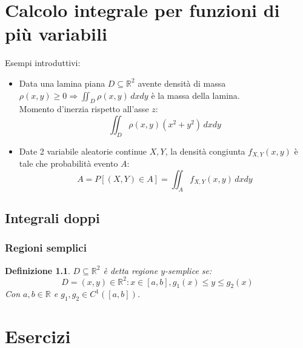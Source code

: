 \documentclass{scrreprt}
\newtheorem{defn}{Definizione}
\newenvironment{definition}{\begin{mdframed}[backgroundcolor=Ivory2]\begin{defn}}{\end{defn}\end{mdframed}}
\begin{document}
\chapter{Calcolo integrale per funzioni di più variabili}
Esempi introduttivi:
\begin{itemize}
	\item Data una lamina piana $D \subseteq \mathbb{R}^2$ avente densità di massa $\rho(x,y) \geq 0 \Longrightarrow \iint_D \rho(x,y) \, dxdy$ è la massa della lamina.\\
			Momento d'inerzia rispetto all'asse $z$:
			\begin{equation}
				\iint_D \rho(x,y) (x^2 + y^2) \, dxdy
			\end{equation}
	\item Date 2 variabile aleatorie continue $X,Y$, la densità congiunta $f_{X,Y}(x,y)$ è tale che probabilità evento $A$:
		\begin{equation}
			A = P[(X,Y) \in A] = \iint_A f_{X,Y}(x,y) \, dxdy
		\end{equation}
\end{itemize}

\section{Integrali doppi}
\subsection{Regioni semplici}
\begin{definition}
	$D \subseteq \mathbb{R}^2$ è detta regione $y$-semplice se:
	\begin{equation}
		D = {(x,y) \in \mathbb{R}^2: x \in [a,b], g_1(x) \leq y \leq g_2(x)}
	\end{equation}
	Con $a,b \in \mathbb{R}$ e $g_1,g_2 \in C^1([a,b])$. %
\end{definition}





\chapter{Esercizi}
\end{document}
